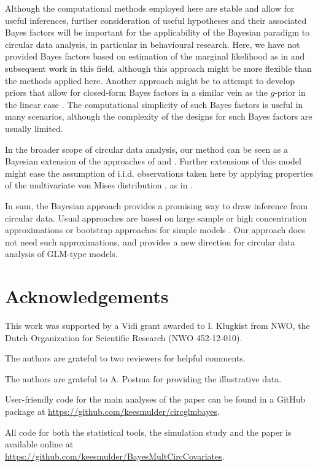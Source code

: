Although the computational methods employed here are stable and allow for useful inferences, further consideration of useful hypotheses and their associated Bayes factors will be important for the applicability of the Bayesian paradigm to circular data analysis, in particular in behavioural research. Here, we have not provided Bayes factors based on estimation of the marginal likelihood as in \citet{chib1995marginal} and subsequent work in this field, although this approach might be more flexible than the methods applied here. Another approach might be to attempt to develop priors that allow for closed-form Bayes factors in a similar vein as the \(g\)-prior in the linear case \citep{zellner1986bayesian, liang2012mixtures}. The computational simplicity of such Bayes factors is useful in many scenarios, although the complexity of the designs for such Bayes factors are usually limited.

In the broader scope of circular data analysis, our method can be seen as a Bayesian extension of the approaches of \citet{artes2008hypothesis} and \citet{lagona2016regression}. Further extensions of this model might ease the assumption of i.i.d. observations taken here by applying properties of the multivariate von Mises distribution \citep{mardia2008multivariate, mardia2014some}, as in \citet{lagona2016regression}.

In sum, the Bayesian approach provides a promising way to draw inference from circular data. Usual approaches are based on large sample or high concentration approximations \citep{artes2008hypothesis} or bootstrap approaches for simple models \citep{baayen2012test, baayen2014evaluating}. Our approach does not need such approximations, and provides a new direction for circular data analysis of GLM-type models.

\section{Acknowledgements}

This work was supported by a Vidi grant awarded to I. Klugkist from NWO, the Dutch Organization for Scientific Research (NWO 452-12-010).

The authors are grateful to two reviewers for helpful comments.

The authors are grateful to A. Postma for providing the illustrative data.

User-friendly code for the main analyses of the paper can be found in a GitHub package at \url{https://github.com/keesmulder/circglmbayes}.

All code for both the statistical tools, the simulation study and the paper is available online at \\ \url{https://github.com/keesmulder/BayesMultCircCovariates}.





\newpage

